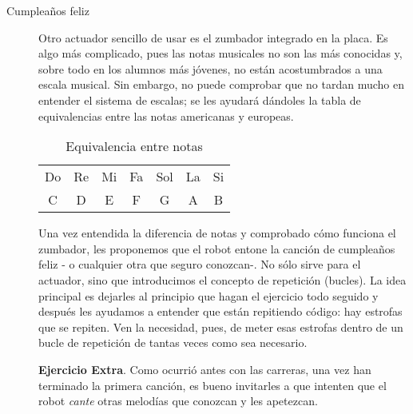 \begin{description}
\item [Cumpleaños feliz]\label{ej:cumple}
Otro actuador sencillo de usar es el zumbador integrado en la placa. Es algo más complicado, pues las notas musicales no son las más conocidas y, sobre todo en los alumnos más jóvenes, no están acostumbrados a una escala musical. Sin embargo, no puede comprobar que no tardan mucho en entender el sistema de escalas; se les ayudará dándoles la tabla de equivalencias entre las notas americanas y europeas.
\begin{table}[H]\centering
	\begin{tabular}{||ccccccc||}
		\hline
		Do & Re & Mi & Fa & Sol & La & Si \\[1.5pt]
		C & D & E & F & G & A & B \\
		\hline
	\end{tabular}
	\caption{Equivalencia entre notas}
\end{table}

Una vez entendida la diferencia de notas y comprobado cómo funciona el zumbador, les proponemos que el robot entone la canción de cumpleaños feliz - o cualquier otra 	que seguro conozcan-. No sólo sirve para el actuador, sino que introducimos el concepto de repetición (bucles). La idea principal es dejarles al principio que hagan el ejercicio todo seguido y después les ayudamos a entender que están repitiendo código: hay estrofas que se repiten. Ven la necesidad, pues, de meter esas estrofas dentro de un bucle de repetición de tantas veces como sea necesario.

\textbf{Ejercicio Extra}. Como ocurrió antes con las carreras, una vez han terminado la primera canción, es bueno invitarles a que intenten que el robot \textit{cante} otras melodías que conozcan y les apetezcan.


\end{description}
